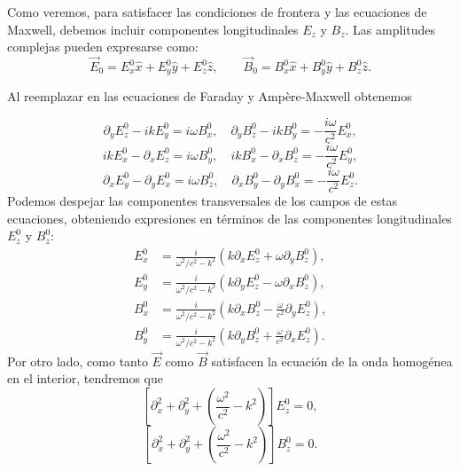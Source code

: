 Como veremos, para satisfacer las condiciones de frontera y las ecuaciones de Maxwell, debemos incluir componentes longitudinales $E_z$ y $B_z$. 
Las amplitudes complejas pueden expresarse como:
\begin{equation}
\vec{E}_0 = E^0_x \hat{x} + E^0_y \hat{y} + E^0_z \hat{z},
\qquad
\vec{B}_0 = B^0_x \hat{x} + B^0_y \hat{y} + B^0_z \hat{z}.
\end{equation}

Al reemplazar en las ecuaciones de Faraday y Ampère-Maxwell obtenemos


\begin{equation}
    \partial_y E^0_z - ik E^0_y = i\omega B^0_x, \quad
    \partial_y B^0_z - ik B^0_y = -\frac{i\omega}{c^2} E^0_x,
\end{equation}
\begin{equation}
    ik E^0_x - \partial_x E^0_z = i\omega B^0_y, \quad
    ik B^0_x - \partial_x B^0_z = -\frac{i\omega}{c^2} E^0_y,
\end{equation}
\begin{equation}
    \partial_x E^0_y - \partial_y E^0_x = i\omega B^0_z, \quad
    \partial_x B^0_y - \partial_y B^0_x = -\frac{i\omega}{c^2} E^0_z.
\end{equation}
Podemos despejar las componentes transversales de los campos de estas ecuaciones, obteniendo expresiones en términos de las componentes longitudinales $E^0_z$ y $B^0_z$:
\begin{align}
    E^0_x &= \frac{i}{\omega^2/c^2 - k^2} \left( k \partial_x E^0_z + \omega \partial_y B^0_z \right), \label{ExGO}\\
    E^0_y &= \frac{i}{\omega^2/c^2 - k^2} \left( k \partial_y E^0_z - \omega \partial_x B^0_z \right), \label{EyGO}\\
    B^0_x &= \frac{i}{\omega^2/c^2 - k^2} \left( k \partial_x B^0_z - \frac{\omega}{c^2} \partial_y E^0_z \right), \label{BxGO}\\
    B^0_y &= \frac{i}{\omega^2/c^2 - k^2} \left( k \partial_y B^0_z + \frac{\omega}{c^2} \partial_x E^0_z \right). \label{ByGO}
\end{align}
Por otro lado, como tanto $\vec{E}$ como $\vec{B}$ satisfacen la ecuación de la onda homogénea en el interior, tendremos que
\begin{equation}
\left[ \partial^2_x + \partial^2_y + \left( \frac{\omega^2}{c^2} - k^2 \right) \right] E^0_z = 0,
\end{equation}
\begin{equation}\label{EOBzGO}
\left[ \partial^2_x + \partial^2_y + \left( \frac{\omega^2}{c^2} - k^2 \right) \right] B^0_z = 0.
\end{equation}

